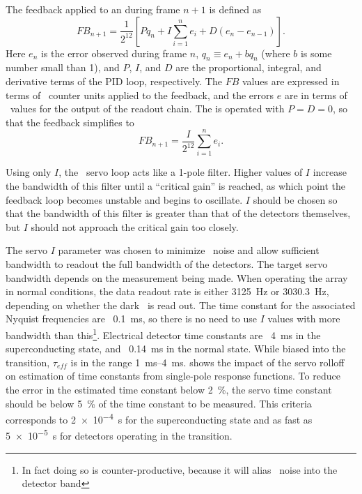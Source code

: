 The feedback applied to an  during frame $n+1$ is defined as \cite{mce_team_data_2013}
\begin{equation}
  FB_{n+1} = \frac{1}{2^{12}} \left[P q_n + I \sum_{i=1}^n e_i + D (e_n - e_{n-1}) \right].
\end{equation}
Here $e_n$ is the error observed during frame $n$, $q_n \equiv e_n + b q_n$ (where $b$ is some number small than 1), and $P$, $I$, and $D$ are the proportional, integral, and derivative terms of the PID loop, respectively.
The $FB$ values are expressed in terms of \DAC\ counter units applied to the  feedback, and the errors $e$ are in terms of \ADC\ values for the output of the readout chain.
The \Imager is operated with $P = D = 0$, so that the feedback simplifies to
\begin{equation} \label{eqn:mce-pid-i-only}
  FB_{n+1} = \frac{I}{2^{12}} \sum_{i=1}^n e_i.
\end{equation}

Using only $I$, the \MCE\ servo loop acts like a 1-pole filter.
Higher values of $I$ increase the bandwidth of this filter until a ``critical gain'' is reached, as which point the feedback loop becomes unstable and begins to oscillate.
$I$ should be chosen so that the bandwidth of this filter is greater than that of the detectors themselves, but $I$ should not approach the critical gain too closely.

The servo $I$ parameter was chosen to minimize \SQUID\ noise and allow sufficient bandwidth to readout the full bandwidth of the detectors.
The target servo bandwidth depends on the measurement being made.
When operating the array in normal conditions, the data readout rate is either \SI{3125}{Hz} or \SI{3030.3}{Hz}, depending on whether the dark \SQUID\ is read out.
The time constant for the associated Nyquist frequencies are \abt~\SI{0.1}{ms}, so there is no need to use $I$ values with more bandwidth than this\footnote{In fact doing so is counter-productive, because it will alias \SQUID\ noise into the detector band}.
Electrical detector time constants are \abt~\SI{4}{ms} in the superconducting state, and \abt~\SI{0.14}{ms} in the normal state.
While biased into the transition, $\tau_{eff}$ is in the range \SIrange{1}{4}{ms}.
 shows the impact of the servo rolloff on estimation of time constants from single-pole response functions.
To reduce the error in the estimated time constant below \SI{2}{\percent}, the servo time constant should be below \SI{5}{\percent} of the time constant to be measured.
This criteria corresponds to \SI{2e-4}{s} for the superconducting state and as fast as \SI{5e-5}{s} for detectors operating in the transition.

